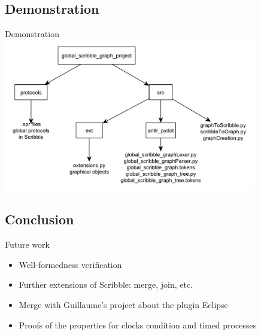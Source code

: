 \documentclass[8 pt]{beamer}
\begin{document}
\subsection{Demonstration}

\begin{frame}{Demonstration}
\includegraphics[width=11cm]{project_organisation}
\end{frame}

\subsection*{Conclusion}
\begin{frame}{Future work}
\begin{alertblock}{}
\begin{itemize}
\item<1-> Well-formedness verification
\item<1-> Further extensions of Scribble: merge, join, etc.
\item<1-> Merge with Guillaume's project about the plugin Eclipse
\item<1-> Proofs of the properties for clocks condition and timed processes
\end{itemize}
\end{alertblock}
~~\\
~~\\
~~\\
~~\\
\end{frame}
\end{document}
